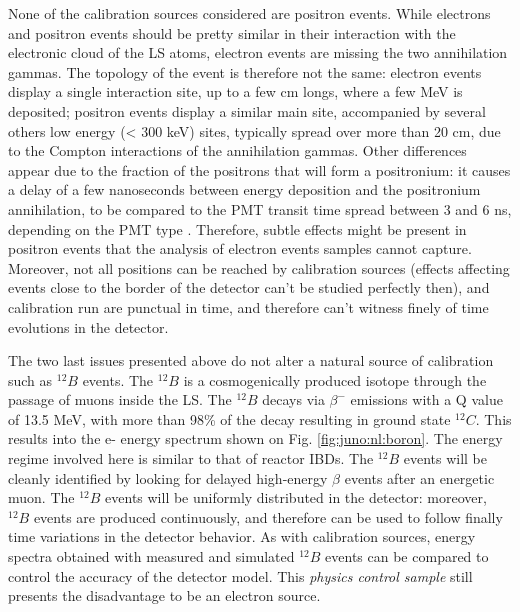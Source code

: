 \documentclass[../main.tex]{subfiles}
\begin{document}
None of the calibration sources considered are positron events. While electrons and positron events should be pretty similar in their interaction with the electronic cloud of the LS atoms,
electron events are missing the two annihilation gammas. The topology of the event is therefore not the same: electron events display a single interaction site, up to a few cm longs, where a few MeV is deposited; positron events display a similar main site, accompanied by several others low energy (< 300 keV) sites, typically spread over more than 20 cm, due to the Compton interactions of the annihilation gammas. Other differences appear due to the fraction of the positrons that will  form a positronium: it causes a delay of a few nanoseconds between  energy deposition and the positronium annihilation, to be compared to the PMT  transit time spread between 3 and 6 ns, depending on the PMT type \cite{rodphai_20-inch_2021, liao_study_2017, li_characterization_2018}. Therefore, subtle effects might be present in positron events that the analysis of electron events samples cannot capture. Moreover, not all positions can be reached by calibration sources (effects affecting events close to the border of the detector can't be studied perfectly then), and calibration run are punctual in time, and therefore can't witness finely of time evolutions in the detector.

The two last issues presented above do not alter a natural source of calibration such as $^{12}B$ events. The $^{12}B$ is a cosmogenically produced isotope through the passage of muons inside the LS. The $^{12}B$ decays via $\beta^-$ emissions with a Q value of 13.5 MeV, with more than 98\% of the decay resulting in ground state $^{12}C$. This results into the e- energy spectrum shown on Fig. \ref{fig:juno:nl:boron}. The energy regime involved here is similar to that of reactor IBDs. The $^{12}B$ events will be cleanly identified by looking for delayed high-energy $\beta$ events after an energetic muon. The $^{12}B$ events will be uniformly distributed in the detector: moreover, $^{12}B$ events are produced continuously, and therefore can be used to follow finally time variations in the detector behavior. As with calibration sources, energy spectra obtained with measured and simulated $^{12}B$ events can be compared to control the accuracy of the detector model. This \textit{physics control sample} still presents the disadvantage to be an electron source.
\end{document}
